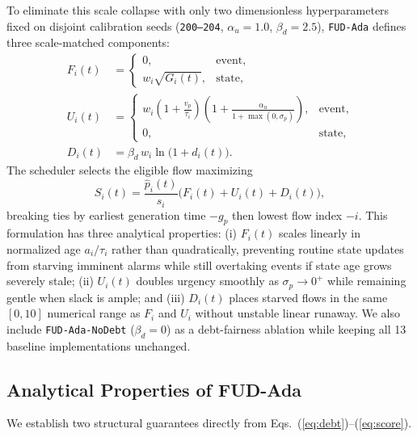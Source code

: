 \documentclass[journal]{IEEEtran}
\begin{document}
To eliminate this scale collapse with only two dimensionless hyperparameters fixed on disjoint calibration seeds (\texttt{200--204}, $\alpha_u{=}1.0$, $\beta_d{=}2.5$), \texttt{FUD-Ada} defines three scale-matched components:
\begin{align}
F_i(t) &= \begin{cases} 0, & \text{event}, \\ w_i \sqrt{G_i(t)}, & \text{state}, \end{cases} \label{eq:f_term}\\
U_i(t) &= \begin{cases} w_i\!\left(1{+}\tfrac{v_p}{\tau_i}\right)\!\left(1{+}\tfrac{\alpha_u}{1+\max(0,\sigma_p)}\right), & \text{event}, \\ 0, & \text{state}, \end{cases} \label{eq:u_term}\\
D_i(t) &= \beta_d\, w_i \ln\!\big(1 + d_i(t)\big). \label{eq:d_term}
\end{align}
The scheduler selects the eligible flow maximizing
\begin{equation}
S_i(t) = \frac{\hat{p}_i(t)}{s_i}\big(F_i(t) + U_i(t) + D_i(t)\big),
\label{eq:score}
\end{equation}
breaking ties by earliest generation time $-g_p$ then lowest flow index $-i$. This formulation has three analytical properties: (i) $F_i(t)$ scales linearly in normalized age $a_i/\tau_i$ rather than quadratically, preventing routine state updates from starving imminent alarms while still overtaking events if state age grows severely stale; (ii) $U_i(t)$ doubles urgency smoothly as $\sigma_p \to 0^+$ while remaining gentle when slack is ample; and (iii) $D_i(t)$ places starved flows in the same $[0, 10]$ numerical range as $F_i$ and $U_i$ without unstable linear runaway. We also include \texttt{FUD-Ada-NoDebt} ($\beta_d{=}0$) as a debt-fairness ablation while keeping all 13 baseline implementations unchanged.

\subsection{Analytical Properties of FUD-Ada}
We establish two structural guarantees directly from Eqs.~(\ref{eq:debt})--(\ref{eq:score}).
\end{document}
